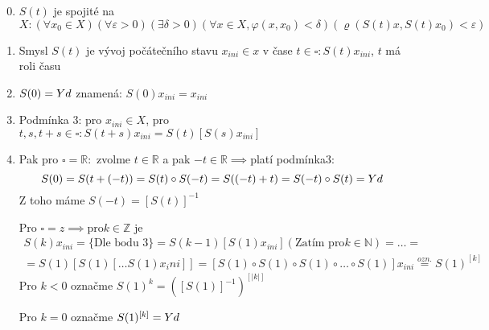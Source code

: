 \documentclass[../main.tex]{subfiles}
\begin{document}
\begin{remark}
    \hphantom{1}
    \begin{enumerate}
        \setcounter{enumi}{-1}
        \item $S(t)$ je spojité na $X: (\forall x_0 \in X)(\forall\varepsilon>0)(\exists \delta > 0)(\forall x\in X, \varphi(x,x_0)<\delta)(\varrho(S(t)x, S(t)x_0)< \varepsilon)$
        \item Smysl $S(t)$ je vývoj počátečního stavu $x_{ini}\in x$ v čase $t\in \square: S(t)x_{ini}$, $t$ má roli času
        \item $S(0) = Yd$ znamená: $S(0)x_{ini} = x_{ini}$
        \item Podmínka 3: pro $x_{ini} \in X$, pro $t,s,t+s\in \square : S (t+s)x_{ini} = S(t)[S(s)x_{ini}]$
        \item Pak pro $\square = \mathbb{R}:$ zvolme $t\in \mathbb{R}$ a pak $-t \in \mathbb{R} \implies $platí podmínka$ 3:$ \begin{equation}
            S(0) = S(t + (-t)) = S(t) \circ S(-t) = S((-t) + t) = S(-t) \circ S(t) = Yd
        \end{equation}
        Z toho máme $S(-t) = [S(t)]^{-1}$
        
        Pro $\square = z \implies $pro$ k\in \mathbb{Z}$ je 
        \begin{multline}
            S(k) x_{ini} = \{\text{Dle bodu 3}\} = S(k-1)[S(1)x_{ini}] (\text{Zatím pro} k\in\mathbb{N}) = \dots = \\
            = S(1)[S(1)[\dots S(1)x_ini]] = [S(1)\circ S(1)\circ S(1)\circ \dots \circ S(1)]x_{ini} \overset{ozn.}{=} S(1)^{[k]}
        \end{multline}
        Pro $k<0$ označme $S(1)^{k} = \left([S(1)]^{-1}\right)^{[|k|]}$

        Pro $k=0$ označme $S(1)^{[k]} = Yd$
    \end{enumerate}
\end{remark}
\end{document}
